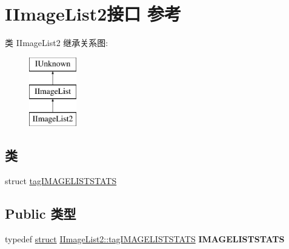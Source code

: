 \hypertarget{interface_i_image_list2}{}\section{I\+Image\+List2接口 参考}
\label{interface_i_image_list2}
类 I\+Image\+List2 继承关系图\+:\begin{figure}[H]
\begin{center}
\leavevmode
\includegraphics[height=3.000000cm]{interface_i_image_list2}
\end{center}
\end{figure}
\subsection*{类}
\begin{DoxyCompactItemize}
\item 
struct \hyperlink{struct_i_image_list2_1_1tag_i_m_a_g_e_l_i_s_t_s_t_a_t_s}{tag\+I\+M\+A\+G\+E\+L\+I\+S\+T\+S\+T\+A\+TS}
\end{DoxyCompactItemize}
\subsection*{Public 类型}
\begin{DoxyCompactItemize}
\item 
\mbox{\label{interface_i_image_list2_a4e44a6b439ad591b2907619ecf64ceb8}} 
typedef \hyperlink{interfacestruct}{struct} \hyperlink{struct_i_image_list2_1_1tag_i_m_a_g_e_l_i_s_t_s_t_a_t_s}{I\+Image\+List2\+::tag\+I\+M\+A\+G\+E\+L\+I\+S\+T\+S\+T\+A\+TS} {\bfseries I\+M\+A\+G\+E\+L\+I\+S\+T\+S\+T\+A\+TS}
\end{DoxyCompactItemize}
